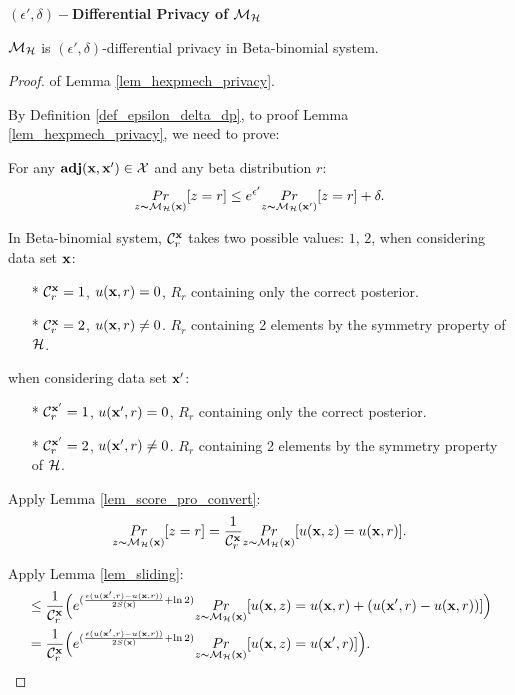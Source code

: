 \documentclass{article}
\begin{document}
\noindent \textbf{$(\epsilon', \delta)-$Differential Privacy of $\mathcal{M}_{\mathcal{H}}$}
\begin{lem}
\label{lem_hexpmech_privacy}
$\mathcal{M}_{\mathcal{H}}$ is $(\epsilon', \delta)$-differential privacy in Beta-binomial system.
\end{lem}

\begin{proof} of Lemma \ref{lem_hexpmech_privacy}.

  By Definition \ref{def_epsilon_delta_dp}, to proof Lemma \ref{lem_hexpmech_privacy}, we need to prove:

  For any $\textbf{adj}(\textbf{x},\textbf{x}') \in \mathcal{X}$ and any beta distribution $r$:
  \begin{equation*}
  \underset{z \thicksim \mathcal{M}_{\mathcal{H}}(\textbf{x})}{Pr}[z = r] \leq e^{\epsilon'} \underset{z \thicksim \mathcal{M}_{\mathcal{H}}(\textbf{x}')}{Pr}[z = r] + \delta. 
  \end{equation*}

   In Beta-binomial system, $\mathcal{C}^{\textbf{x}}_{r}$ takes two possible values: $1$, $2$, when considering data set $\textbf{x}$:
  \begin{itemize}
    \item[*] $\mathcal{C}^{\textbf{x}}_{r} = 1$, $u(\textbf{x}, {r}) = 0$,  $R_r$ containing only the correct posterior.
    \item[*] $\mathcal{C}^{\textbf{x}}_{r} = 2$, $u(\textbf{x}, {r}) \neq 0$. $R_r$ containing 2 elements by the symmetry property of $\mathcal{H}$.
  \end{itemize}
  when considering data set $\textbf{x}'$:
  \begin{itemize}
    \item[*] $\mathcal{C}^{\textbf{x}'}_{r} = 1$, $u(\textbf{x}', {r}) = 0$,  $R_r$ containing only the correct posterior.
    \item[*] $\mathcal{C}^{\textbf{x}'}_{r} = 2$, $u(\textbf{x}', {r}) \neq 0$. $R_r$ containing 2 elements by the symmetry property of $\mathcal{H}$.
  \end{itemize}

 
      Apply Lemma \ref{lem_score_pro_convert}:  
      \begin{equation*}
      \underset{z \thicksim \mathcal{M}_{\mathcal{H}}(\textbf{x})}{Pr}[z = r] = \frac{1}{\mathcal{C}^{\textbf{x}}_{r}} \underset{z \thicksim \mathcal{M}_{\mathcal{H}}(\textbf{x})}{Pr}[u(\textbf{x}, {z}) = u(\textbf{x}, {r})].
      \end{equation*}

      Apply Lemma \ref{lem_sliding}:
      \begin{equation*}
      \begin{split}
      & \leq \frac{1}{\mathcal{C}^{\textbf{x}}_{r}} \Big( e^{(\frac{\epsilon (u(\textbf{x}', {r}) - u(\textbf{x}, {r}))}{2 S(\textbf{x})} + \ln 2)} \underset{z \thicksim \mathcal{M}_{\mathcal{H}}(\textbf{x})}{Pr}[u(\textbf{x}, {z}) = u(\textbf{x}, {r}) + (u(\textbf{x}', {r}) - u(\textbf{x}, {r}))] \Big)\\
      & = \frac{1}{\mathcal{C}^{\textbf{x}}_{r}} \Big( e^{(\frac{\epsilon (u(\textbf{x}', {r}) - u(\textbf{x}, {r}))}{2 S(\textbf{x})} + \ln 2)} \underset{z \thicksim \mathcal{M}_{\mathcal{H}}(\textbf{x})}{Pr}[u(\textbf{x}, {z}) = u(\textbf{x}', {r}) ] \Big).
      \end{split}
      \end{equation*}


\end{proof}
\end{document}
